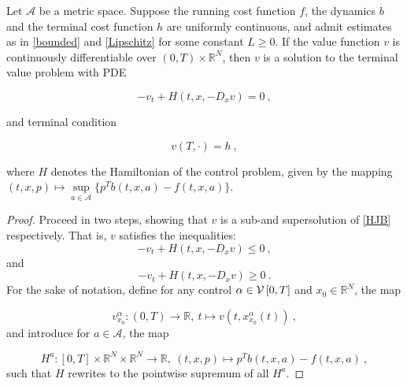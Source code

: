 

\begin{theorem}
	\label{classical solution HJB}
	Let $ \mathcal{A} $ be a metric space. Suppose the running cost function $ f $, the dynamics $ b $ and the terminal cost function $ h $ are uniformly continuous, and admit estimates as in \eqref{bounded} and \eqref{Lipschitz} for some constant $ L \geq 0 $. If the value function $ v $ is continuously differentiable over $ \left( 0, T \right) \times \mathbb{R}^N $, then $ v $ is a solution to the terminal value problem with PDE
	
	\begin{equation}
		\label{HJB}
		-v_t + H(t, x, -D_x v) = 0 \ ,
	\end{equation}
	
	and terminal condition
	
	\begin{equation}
		\label{boundary}
		v(T, \cdot) = h \ ,
	\end{equation}
	
	where $ H $ denotes the Hamiltonian of the control problem, given by the mapping $ (t, x, p) \mapsto \sup\limits_{a \in \mathcal{A}} \bigg\{ p^{T} b(t, x, a) - f(t, x, a) \bigg\} $.
	\begin{proof}
		Proceed in two steps, showing that $ v $ is a sub-and supersolution of \eqref{HJB} respectively. That is, $ v $ satisfies the inequalities:
		\begin{equation}
			\label{value_subsolution}
			-v_t + H(t, x, -D_x v) \leq 0 \ ,
		\end{equation}
		and 
		\begin{equation}
			\label{value_supersolution}
			-v_t + H(t, x, - D_x v) \geq 0 \ .
		\end{equation}
		For the sake of notation, define for any control $ \alpha \in \mathcal{V}\left[ {0}, T \right] $ and $ x_0 \in \mathbb{R}^N $, the map
		
		\begin{equation*}
			v^{\alpha}_{x_0} : \left( 0 , T \right) \to \mathbb{R}, \ t \mapsto v(t, x^{\alpha}_{x_0}(t)) \ ,
		\end{equation*}
		and introduce for $ a \in \mathcal{A} $, the map
		
		\begin{equation*}
			H^{a} : \left[ 0, T \right] \times \mathbb{R}^{N} \times \mathbb{R}^N \to \mathbb{R}, \ (t, x, p) \mapsto p^{T} b(t, x, a) - f(t, x, a) \ ,
		\end{equation*}
		such that $ H $ rewrites to the pointwise supremum of all $ H^{a} $.
		

\end{proof}
\end{theorem}
